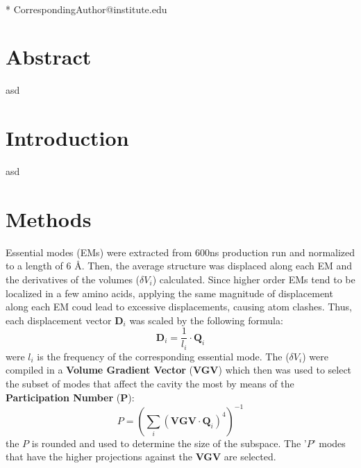 \documentclass[10pt,letterpaper]{article}
\date{}
\begin{document}
\vspace*{0.35in}

\begin{flushleft}
{\Large
\textbf{}
}
\newline
\\


* CorrespondingAuthor@institute.edu
\end{flushleft}

\linenumbers
\section{Abstract}
asd
\newpage
\section{Introduction}
asd



\newpage
\section{Methods}

Essential modes (EMs) were extracted from 600ns production run and normalized to a length of 6 \AA . Then, the average structure was displaced along each EM and the derivatives of the volumes (\(\delta V_{i}\)) calculated. Since higher order EMs tend to be localized in a few amino acids, applying the same magnitude of displacement along each EM coud lead to excessive displacements, causing atom clashes. Thus, each displacement vector \(\mathbf{D}_i\) was scaled by the following formula:
$$
\mathbf{D}_i = \frac{1}{l_i} \cdot \mathbf{Q}_i
$$
were \(l_i\) is the frequency of the corresponding essential mode.
The (\(\delta V_{i}\)) were compiled in a  \textbf{Volume Gradient Vector} (\textbf{VGV}) which then was used to select the subset of modes that affect the cavity the most by means of the \textbf{Participation Number} (\(\mathbf{P}\)):
$$
P = ({\sum_i {(\mathbf{VGV} \cdot \mathbf{Q}_i)}^4})^{-1}
$$
the \({P}\) is rounded and used to determine the size of the subspace. The '\({P}\)' modes that have the higher projections against the \textbf{VGV} are selected.\newline
\end{document}

